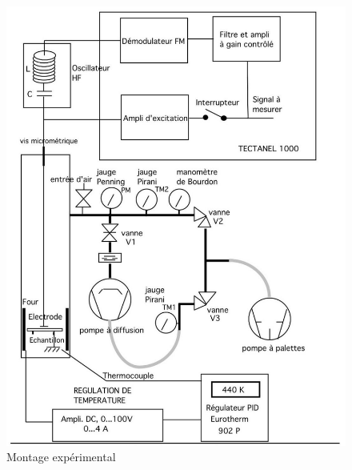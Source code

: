 
\begin{figure}
    \centering
    \includegraphics[width=\linewidth]{figures/montage.png}
    \caption{Montage expérimental \cite{notice}}
    \label{fig:montage}
\end{figure}

